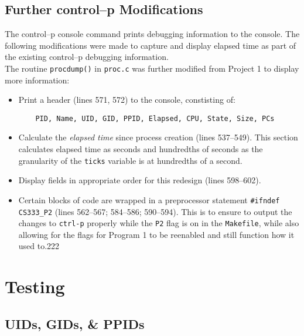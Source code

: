 \documentclass[11pt,letterpaper]{report}
\begin{document}
	
	\newpage
		
	\subsection*{Further control--p Modifications}
	The control--p console command prints debugging information to the console. The following modifications were made to capture and display elapsed time as part of the existing control--p debugging information.\\
	The routine {\tt procdump()} in {\tt proc.c} was further modified from Project 1 to display more information: 
	
	\begin{itemize}
	
	\item Print a header ({\color{red}lines 571, 572}) to the console, constisting of:
	\begin{verbatim}
	PID, Name, UID, GID, PPID, Elapsed, CPU, State, Size, PCs
	\end{verbatim}
	
	\item Calculate the \emph{elapsed time} since process creation ({\color{red}lines 537--549}). This section calculates elapsed time as seconds and hundredths of seconds as the granularity of the {\tt ticks} variable is at hundredths of a second.
	
	\item Display fields in appropriate order for this redesign ({\color{red}lines 598--602}).
	
	\item Certain blocks of code are wrapped in a preprocessor statement {\tt \#ifndef CS333\_P2} ({\color{red}lines 562--567; 584--586; 590--594}). This is to ensure to output the changes to {\tt ctrl-p} properly while the {\tt P2} flag is on in the {\tt Makefile}, while also allowing for the flags for Program 1 to be reenabled and still function how it used to.222
	
	\end{itemize}
	

\newpage
	\section*{Testing}
	
	\subsection*{UIDs, GIDs, \& PPIDs}
	
\end{document}

